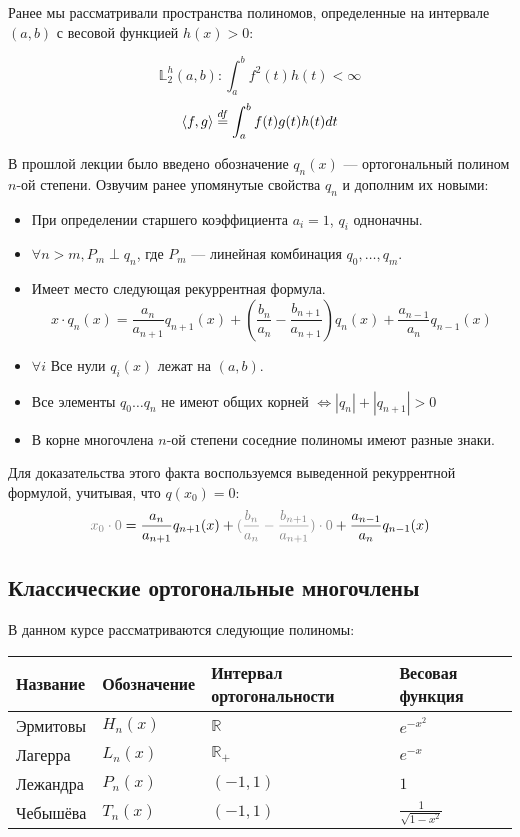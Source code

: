 	Ранее мы рассматривали пространства полиномов, определенные на интервале $(a, b)$ с весовой функцией $h(x) > 0$:
	
	$$\mathbb{L}_2^h (a, b): \int_a^b f^2(t) h(t) < \infty$$
	$$\left\langle f, g \right\rangle \overset{df}{=} \int_a^b f(t) g(t) h(t) dt$$
	
	В прошлой лекции было введено обозначение $q_n(x)$ --- ортогональный полином $n$-ой степени. Озвучим ранее упомянутые
	свойства $q_n$ и дополним их новыми:
	
	\begin{itemize}
		\item При определении старшего коэффициента $a_i = 1$, $q_i$ одноначны.
		\item $\forall n > m, P_m \perp q_n$, где $P_m$ --- линейная комбинация $q_0, \dots , q_m$.
		\item Имеет место следующая рекуррентная формула.
		$$x \cdot q_n(x) = 
		\frac{a_n}{a_{n+1}} q_{n+1}(x) + (\frac{b_n}{a_n} - \frac{b_{n+1}}{a_{n+1}}) q_n(x) + \frac{a_{n-1}}{a_n} q_{n-1}(x)$$
		\item $\forall i$ Все нули $q_i(x)$ лежат на $(a, b)$.
		\item Все элементы $q_0 \dots q_n$ не имеют общих корней $\Leftrightarrow |q_n| + |q_{n+1}| > 0$
		\item В корне многочлена $n$-ой степени соседние полиномы имеют разные знаки.
	\end{itemize}
	
	Для доказательства этого факта воспользуемся выведенной рекуррентной формулой, учитывая, что $q(x_0) = 0$:
	$$ {\color{gray}x_0 \cdot 0} = 
	\frac{a_n}{a_{n+1}} q_{n+1}(x) + {\color{gray}(\frac{b_n}{a_n} - \frac{b_{n+1}}{a_{n+1}}) \cdot 0} + \frac{a_{n-1}}{a_n} q_{n-1}(x)$$
		
	
	\subsection{Классические ортогональные многочлены}

	В данном курсе рассматриваются следующие полиномы:

	\begin{table}[!th]
		\begin{tabular}{|l|l|l|l|}
			\hline
			Название & Обозначение & Интервал ортогональности & Весовая функция \\
			\hline
			Эрмитовы & $H_n(x)$ & $\mathbb{R}$ & $e^{-x^2}$ \\
			Лагерра  & $L_n(x)$ & $\mathbb{R}_+$ & $e^{-x}$ \\
			Лежандра & $P_n(x)$ & $(-1, 1)$ & $1$ \\
			Чебышёва & $T_n(x)$ & $(-1, 1)$ & $\frac{1}{\sqrt{1-x^2}}$ \\
			\hline
		\end{tabular}
	\end{table}
	
